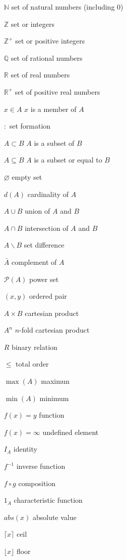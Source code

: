 \begin{itemize}

%
%


\item [$\mathbb{N}$] set of natural numbers (including $0$)
\item [$\mathbb{Z}$] set or integers
\item [$\mathbb{Z}^+$] set or positive integers
\item [$\mathbb{Q}$] set of rational numbers
\item [$\mathbb{R}$] set of real numbers
\item [$\mathbb{R}^+$] set of positive real numbers
\item [$x\in A$] $x$ is a member of $A$
\item [$:$] set formation
\item [$A\subset B$] $A$ is a subset of $B$
\item [$A\subseteq B$] $A$ is a subset or equal to $B$
\item [$\varnothing$] empty set
\item [$d(A)$] cardinality of $A$
\item [$A\cup B$] union of $A$ and $B$
\item [$A\cap B$] intersection of $A$ and $B$
\item [$A \backslash B$] set difference
\item [$\bar{A}$] complement of $A$
\item [$\mathcal{P}(A)$] power set 


\item [$(x, y)$] ordered pair
\item [$A \times B$] cartesian product
\item [$A^n$] $n$-fold cartesian product
\item [$R$] binary relation
\item [$\leq$] total order
\item [$\max(A)$] maximun
\item [$\min(A)$] minimum


\item [$f(x) = y$] function
\item [$f(x) = \infty$] undefined element
\item [$I_A$] identity
\item [$f^{-1}$] inverse function
\item [$f \circ g$] composition
\item [$1_A$] characteristic function
\item [$abs(x)$] absolute value
\item [$\lceil x \rceil$] ceil
\item [$\lfloor x \rfloor$] floor


\end{itemize}
